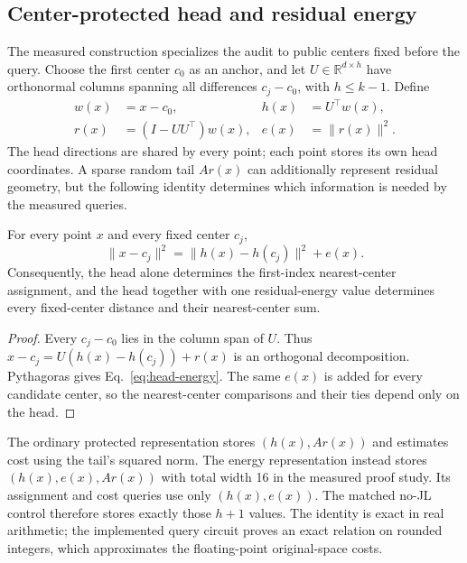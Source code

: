 \subsection{Center-protected head and residual energy}\label{sec:protected-method}
The measured construction specializes the audit to public centers fixed before the query. Choose the first center $c_0$ as an anchor, and let $U\in\mathbb R^{d\times h}$ have orthonormal columns spanning all differences $c_j-c_0$, with $h\leq k-1$. Define
\begin{align}
w(x)&=x-c_0, & h(x)&=U^\top w(x),\\
r(x)&=(I-UU^\top)w(x), & e(x)&=\|r(x)\|^2.
\end{align}
The head directions are shared by every point; each point stores its own head coordinates. A sparse random tail $Ar(x)$ can additionally represent residual geometry, but the following identity determines which information is needed by the measured queries.

\begin{proposition}\label{prop:head-energy}
For every point $x$ and every fixed center $c_j$,
\begin{equation}\label{eq:head-energy}
\|x-c_j\|^2=\|h(x)-h(c_j)\|^2+e(x).
\end{equation}
Consequently, the head alone determines the first-index nearest-center assignment, and the head together with one residual-energy value determines every fixed-center distance and their nearest-center sum.
\end{proposition}
\begin{proof}
Every $c_j-c_0$ lies in the column span of $U$. Thus
$x-c_j=U(h(x)-h(c_j))+r(x)$ is an orthogonal decomposition. Pythagoras gives Eq.~\eqref{eq:head-energy}. The same $e(x)$ is added for every candidate center, so the nearest-center comparisons and their ties depend only on the head.
\end{proof}

The ordinary protected representation stores $(h(x),Ar(x))$ and estimates cost using the tail's squared norm. The energy representation instead stores $(h(x),e(x),Ar(x))$ with total width 16 in the measured proof study. Its assignment and cost queries use only $(h(x),e(x))$. The matched no-JL control therefore stores exactly those $h+1$ values. The identity is exact in real arithmetic; the implemented query circuit proves an exact relation on rounded integers, which approximates the floating-point original-space costs.

